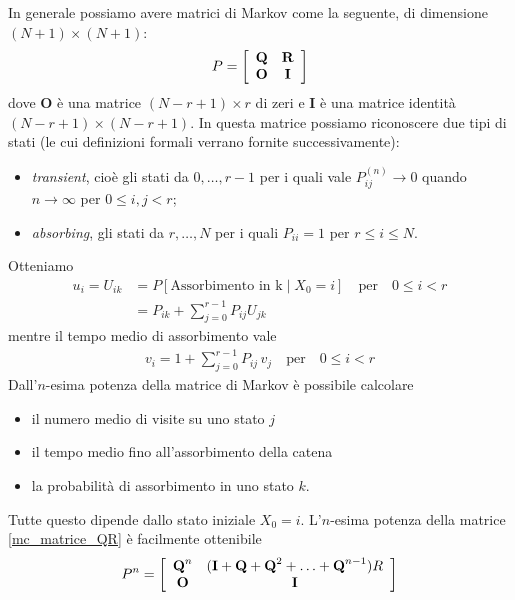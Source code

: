 \documentclass{article}
\begin{document}
In generale possiamo avere matrici di Markov come la seguente, di dimensione $(N+1) \times (N+1)$:
\begin{align}
\label{mc_matrice_QR}
P = \left[\begin{array}{c c}
\textbf{Q} & \textbf{R}\\
\textbf{O} & \textbf{I}
\end{array}\right]
\end{align}
dove \textbf{O} è una matrice $(N-r+1)\times r$ di zeri e \textbf{I} è una matrice identità $(N-r+1)\times(N-r+1)$.
In questa matrice possiamo riconoscere due tipi di stati (le cui definizioni formali verrano fornite successivamente):
\begin{itemize}
    \item \textit{transient}, cioè gli stati da $0,\hdots,r-1$ per i quali vale $P_{ij}^{(n)} \to 0$ quando $n \to \infty$ per $0\le i,j < r$;
    \item \textit{absorbing}, gli stati da $r,\hdots,N$ per i quali $P_{ii} = 1$ per $r \le i \le N$.
\end{itemize}
Otteniamo
\begin{align*}
u_i = U_{ik} &= P[\text{Assorbimento in k} \mid X_0 = i] \quad \text{per} \quad 0 \le i < r\\
&= P_{ik} + \sum_{j = 0}^{r-1} P_{ij}U_{jk}
\end{align*}
mentre il tempo medio di assorbimento vale
\begin{align*}
v_i = 1 + \sum_{j = 0}^{r-1}P_{ij}\,v_j \quad \text{per} \quad 0 \le i < r
\end{align*}
Dall'$n$-esima potenza della matrice di Markov è possibile calcolare
\begin{itemize}
    \item il numero medio di visite su uno stato $j$
    \item il tempo medio fino all'assorbimento della catena
    \item la probabilità di assorbimento in uno stato $k$.
\end{itemize}
Tutte questo dipende dallo stato iniziale $X_0 = i$. L'$n$-esima potenza della matrice \ref{mc_matrice_QR} è facilmente ottenibile
\begin{align}
P^{n} = \left[\begin{array}{c c}
\textbf{Q}^{n} & (\textbf{I}+\textbf{Q}+\textbf{Q}^2+\hdots+\textbf{Q}^{n-1})R\\
\textbf{O} & \textbf{I}
\end{array}\right]
\end{align}
\end{document}
